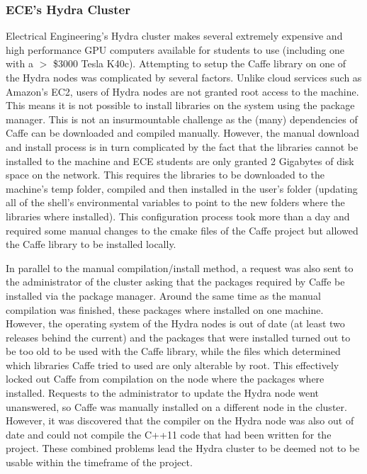\documentclass[12pt]{article}
\begin{document}
\subsubsection{ECE's Hydra Cluster}

	Electrical Engineering's Hydra cluster makes several extremely expensive and high performance GPU computers available for students to use (including one with a $>$ \$3000 Tesla K40c).  Attempting to setup the Caffe library on one of the Hydra nodes was complicated by several factors.  Unlike cloud services such as Amazon's EC2, users of Hydra nodes are not granted root access to the machine.  This means it is not possible to install libraries on the system using the package manager.  This is not an insurmountable challenge as the (many) dependencies of Caffe can be downloaded and compiled manually.  However, the manual download and install process is in turn complicated by the fact that the libraries cannot be installed to the machine and ECE students are only granted 2 Gigabytes of disk space on the network.  This requires the libraries to be downloaded to the machine's temp folder, compiled and then installed in the user's folder (updating all of the shell's environmental variables to point to the new folders where the libraries where installed).  This configuration process took more than a day and required some manual changes to the cmake files of the Caffe project but allowed the Caffe library to be installed locally.

	In parallel to the manual compilation/install method, a request was also sent to the administrator of the cluster asking that the packages required by Caffe be installed via the package manager.  Around the same time as the manual compilation was finished, these packages where installed on one machine.  However, the operating system of the Hydra nodes is out of date (at least two releases behind the current) and the packages that were installed turned out to be too old to be used with the Caffe library, while the files which determined which libraries Caffe tried to used are only alterable by root.  This effectively locked out Caffe from compilation on the node where the packages where installed.  Requests to the administrator to update the Hydra node went unanswered, so Caffe was manually installed on a different node in the cluster.  However, it was discovered that the compiler on the Hydra node was also out of date and could not compile the C++11 code that had been written for the project.  These combined problems lead the Hydra cluster to be deemed not to be usable within the timeframe of the project.
\end{document}
